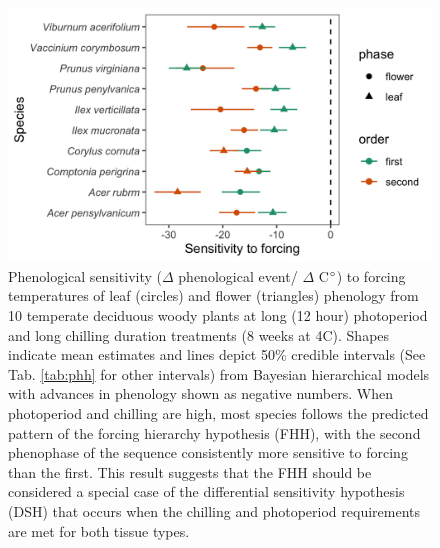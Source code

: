 \documentclass[11pt]{article}\usepackage[]{graphicx}\usepackage[]{color}
\begin{document}
\begin{figure}[h!]
    \centering
         \includegraphics[width=\textwidth]{..//Plots/Flobuds_manuscript_figs/PHH_plot.png} 
    \caption{Phenological sensitivity ($\Delta$ phenological event/ $\Delta$ C$\degree$) to forcing temperatures of leaf (circles) and flower (triangles) phenology from 10 temperate deciduous woody plants at long (12 hour) photoperiod and long chilling duration treatments (8 weeks at 4\degree C). Shapes indicate mean estimates and lines depict 50\% credible intervals (See Tab. \ref{tab:phh} for other intervals) from Bayesian hierarchical models with advances in phenology shown as negative numbers. When photoperiod and chilling are high, most species follows the predicted pattern of the forcing hierarchy hypothesis (FHH), with the second phenophase of the sequence consistently more sensitive to forcing than the first. This result suggests that the FHH should be considered a special case of the differential sensitivity hypothesis (DSH) that occurs when the chilling and photoperiod requirements are met for both tissue types.}
    \label{fig:FHH}
\end{figure}
\end{document}
